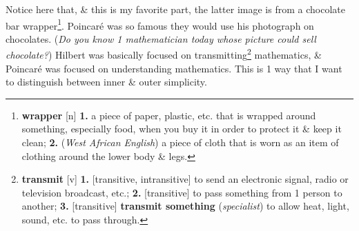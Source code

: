 \documentclass[oneside]{book}
\numberwithin{equation}{section}
\begin{document}
Notice here that, \& this is my favorite part, the latter image is from a chocolate bar wrapper\footnote{\textbf{wrapper} [n] \textbf{1.} a piece of paper, plastic, etc. that is wrapped around something, especially food, when you buy it in order to protect it \& keep it clean; \textbf{2.} (\textit{West African English}) a piece of cloth that is worn as an item of clothing around the lower body \& legs.}. Poincar\'e was so famous they would use his photograph on chocolates. (\textit{Do you know 1 mathematician today whose picture could sell chocolate?}) Hilbert was basically focused on transmitting\footnote{\textbf{transmit} [v] \textbf{1.} [transitive, intransitive] to send an electronic signal, radio or television broadcast, etc.; \textbf{2.} [transitive] to pass something from 1 person to another; \textbf{3.} [transitive] \textbf{transmit something} (\textit{specialist}) to allow heat, light, sound, etc. to pass through.} mathematics, \& Poincar\'e was focused on understanding mathematics. This is 1 way that I want to distinguish between inner \& outer simplicity.
\end{document}

